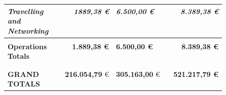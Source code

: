 \documentclass[12pt,a4paper,article]{report} %
\begin{document}
\begin{table}[htp]
\begin{center}
\begin{tabular}{p{0.25\linewidth}   r p{0.25\linewidth} r}
{\footnotesize \emph{Travelling and Networking}}&{\footnotesize \emph{1889,38 \euro{} }}  &{\footnotesize \emph{6.500,00 \euro{} }}   &{\footnotesize \emph{8.389,38 \euro{} }}  \\ \hline \\

\makecell[l] {\textbf{Operations} \\  \textbf{Totals}}& \textbf{1.889,38 \euro{} }& \textbf{6.500,00 \euro{} }&\textbf{8.389,38 \euro{}}\\  \\ \hline \hline \\

\makecell[l] {\textbf{GRAND} \\  \textbf{TOTALS}}& \textbf{216.054,79} \euro{} & \textbf{305.163,00} \euro{} & \textbf{521.217,79 \euro{} }\\ 

\end{tabular}
\end{center}
\label{budget2021}
\end{table}%
\end{document}

